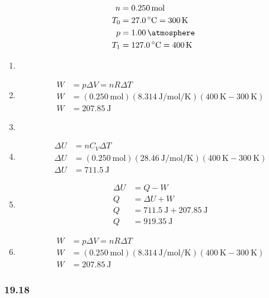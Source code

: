 \documentclass{article}
\begin{document}
\begin{align*}
	n & = \SI{0.250}{\mole} \\
	T_0 & = \SI{27.0}{\celsius} = \SI{300}{\kelvin} \\
	p & = \SI{1.00}{\atmosphere} \\
	T_1 & = \SI{127.0}{\celsius} = \SI{400}{\kelvin}
\end{align*}
\begin{enumerate}[label = \textbf{(\alph*)}]
	\item
	\item
		\begin{align*}
			W & = p\Delta V = nR\Delta T \\
			W & = (\SI{0.250}{\mole})(\SI{8.314}{\joule \per \mole \per \kelvin})(\SI{400}{\kelvin} - \SI{300}{\kelvin}) \\
			W & = \SI{207.85}{\joule}
		\end{align*}
	\item
	\item
		\begin{align*}
			\Delta U & = nC_V\Delta T \\
			\Delta U & = (\SI{0.250}{\mole})(\SI{28.46}{\joule \per \mole \per \kelvin})(\SI{400}{\kelvin} - \SI{300}{\kelvin}) \\
			\Delta U & = \SI{711.5}{\joule}
		\end{align*}
	\item
		\begin{align*}
			\Delta U & = Q - W \\
			Q & = \Delta U + W \\
			Q & = \SI{711.5}{\joule} + \SI{207.85}{\joule} \\
			Q & = \SI{919.35}{\joule}
		\end{align*}
	\item
		\begin{align*}
			W & = p\Delta V = nR\Delta T \\
			W & = (\SI{0.250}{\mole})(\SI{8.314}{\joule \per \mole \per \kelvin})(\SI{400}{\kelvin} - \SI{300}{\kelvin}) \\
			W & = \SI{207.85}{\joule}
		\end{align*}
\end{enumerate}

\subsubsection{19.18}
\end{document}

